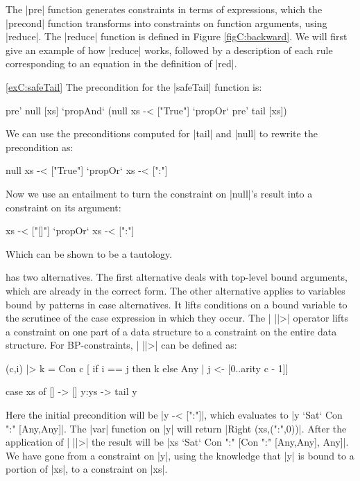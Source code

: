 The |pre| function generates constraints in terms of expressions, which the |precond| function transforms into constraints on function arguments, using |reduce|. The |reduce| function is defined in Figure \ref{figC:backward}. We will first give an example of how |reduce| works, followed by a description of each rule corresponding to an equation in the definition of |red|.

\begin{examplerevisit}{\ref{exC:safeTail}}
The precondition for the |safeTail| function is:

\ignore\begin{code}
pre' null [xs] `propAnd` (null xs -< ["True"] `propOr` pre' tail [xs])
\end{code}

\noindent We can use the preconditions computed for |tail| and |null| to rewrite the precondition as:

\ignore\begin{code}
null xs -< ["True"] `propOr` xs -< [":"]
\end{code}

\noindent Now we use an entailment to turn the constraint on |null|'s result into a constraint on its argument:

\ignore\begin{code}
xs -< ["[]"] `propOr` xs -< [":"]
\end{code}

\noindent Which can be shown to be a tautology.
\end{examplerevisit}


 has two alternatives. The first alternative deals with top-level bound arguments, which are already in the correct form. The other alternative applies to variables bound by patterns in case alternatives. It lifts conditions on a bound variable to the scrutinee of the case expression in which they occur. The | ||>| operator lifts a constraint on one part of a data structure to a constraint on the entire data structure. For BP-constraints, | ||>| can be defined as:

\begin{code}
(c,i) |> k = Con c  [  if i == j then k else Any
                    |  j <- [0..arity c - 1]]
\end{code}

\begin{example}
\ignore\begin{code}
case  xs of
      []    -> []
      y:ys  -> tail y
\end{code}

Here the initial precondition will be |y -< [":"]|, which evaluates to |y `Sat` Con ":" [Any,Any]|. The |var| function on |y| will return |Right (xs,(":",0))|. After the application of | ||>| the result will be |xs `Sat` Con ":" [Con ":" [Any,Any], Any]|. We have gone from a constraint on |y|, using the knowledge that |y| is bound to a portion of |xs|, to a constraint on |xs|.
\end{example}

